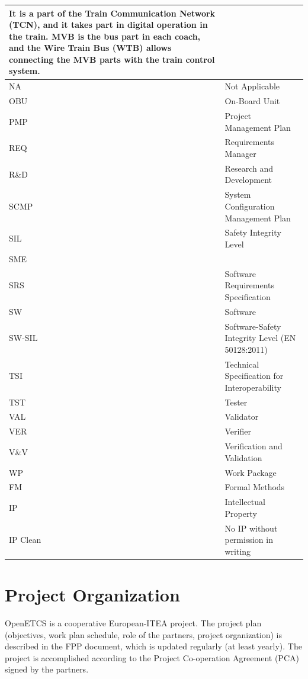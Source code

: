 \documentclass{template/openetcs_article}
\begin{document}
\begin{supertabular}{|m{3cm}m{11cm}|}
It is a part of the Train Communication Network (TCN), and it takes part in digital operation in the train. MVB is the bus part in each coach, and the Wire Train Bus (WTB) allows connecting the MVB parts with the train control system.\\\hline
NA &
Not Applicable\\\hline
OBU &
On-Board Unit\\\hline
PMP &
Project Management Plan\\\hline
REQ &
Requirements Manager\\\hline
R\&D &
Research and Development\\\hline
SCMP &
System Configuration Management Plan\\\hline
SIL &
Safety Integrity Level\\\hline
SME &
~
\\\hline
SRS &
Software Requirements Specification\\\hline
SW &
Software\\\hline
SW-SIL &
Software-Safety Integrity Level (EN 50128:2011)\\\hline
TSI &
Technical Specification for Interoperability\\\hline
TST &
Tester\\\hline
VAL &
Validator\\\hline
VER &
Verifier\\\hline
V\&V &
Verification and Validation\\\hline
WP &
Work Package\\\hline
FM &
Formal Methods\\\hline
IP &
Intellectual Property\\\hline
IP Clean &
No IP without permission in writing \\\hline
\end{supertabular}

\section{Project Organization}



OpenETCS is a cooperative European-ITEA project. The project plan (objectives, work plan schedule, role of the partners, project organization) is described in the \citep{fpp} FPP document, which is updated regularly (at least yearly). The project is accomplished according to the Project Co-operation Agreement (PCA) \citep{PCA} signed by the partners.
\end{document}
